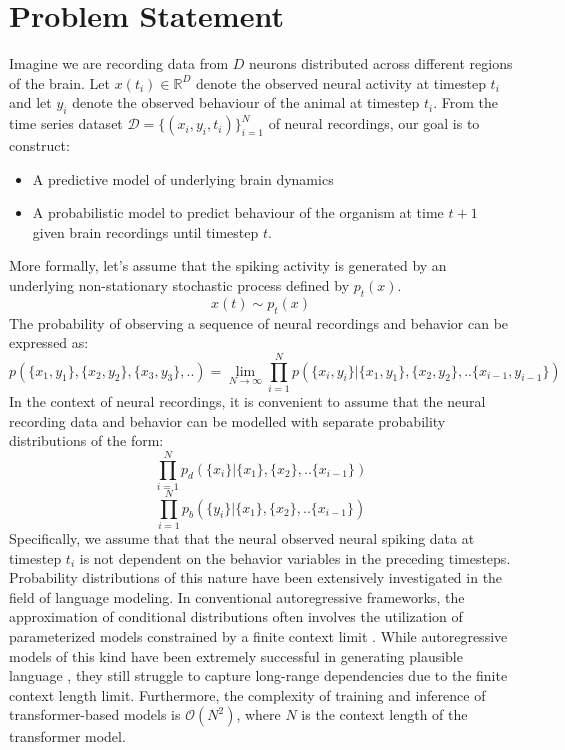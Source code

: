 \chapter{Problem Statement}\label{ch:problem_statement}

Imagine we are recording data from $D$ neurons distributed across different regions of the brain. Let $x(t_i) \in \mathbb{R}^D$ denote the observed neural activity at timestep $t_i$ and let $y_i$ denote the observed behaviour of the animal at timestep $t_i$. From the time series dataset $\mathcal{D} = \{(x_i,y_i,t_i) \}_{i=1}^N$ of neural recordings, our goal is to
construct:
\begin{itemize}
    \item A predictive model of underlying brain dynamics
    \item A probabilistic model to predict behaviour of the organism at time $t+1$ given brain recordings until timestep $t$.
\end{itemize}
More formally, let's assume that the spiking activity is generated by an underlying non-stationary stochastic process defined by $p_t(x)$. 
\begin{equation}
    x(t) \sim p_t(x)
\end{equation}
The probability of observing a sequence of neural recordings and behavior can be expressed as:
\begin{equation}
    p( \{x_1,y_1\},\{x_2,y_2\},\{x_3,y_3\},..) = 
    \lim_{N \to \infty} \prod_{i=1}^{N} p(\{x_{i},y_{i}\}| \{x_1,y_1\},\{x_2,y_2\},..\{x_{i-1},y_{i-1}\})
\end{equation}
In the context of neural recordings, it is convenient to assume that the neural recording data and behavior can be modelled with separate probability distributions of the form:
\begin{equation}
   \prod_{i=1}^{N} p_d(\{x_{i}\}| \{x_1\},\{x_2\},..\{x_{i-1}\})
\end{equation}
\begin{equation}
   \prod_{i=1}^{N} p_b(\{y_{i}\}| \{x_1\},\{x_2\},..\{x_{i-1}\})
\end{equation}
Specifically, we assume that that the neural observed neural spiking data at timestep $t_i$ is not dependent on the behavior variables in the preceding timesteps. Probability distributions of this nature have been extensively investigated in the field of language modeling. In conventional autoregressive frameworks, the approximation of conditional distributions often involves the utilization of parameterized models constrained by a finite context limit \cite{vaswani2017attention}. While autoregressive models of this kind have been extremely successful in generating plausible language \cite{radford2018improving}, they still struggle to capture long-range dependencies due to the finite context length limit\cite{hahn2020theoretical}. Furthermore, the complexity of training and inference of transformer-based models is $\mathcal{O}(N^2)$, where $N$ is the context length of the transformer model.\\

